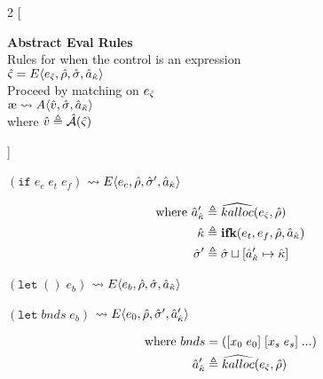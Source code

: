 \documentclass[12pt,draft]{article}
\newcommand\mae{\ensuremath{\text{\ae}}}
\newcommand{\ifsyn}[3]{(\texttt{if}\;#1\;#2\;#3)}
\newcommand{\E}[4]{E\langle #1 , #2 , #3 , #4 \rangle}
\newcommand{\A}[3]{A\langle #1 , #2 , #3 \rangle}
\begin{document}
\newpage
\footnotesize{
\begin{multicols*}{2}
[
\begin{center}
\textbf{Abstract Eval Rules} \\
Rules for when the control is an expression \\
\vspace{2mm}
$\hat{\varsigma} = \E{\ectrl}{\aenv}{\astore}{\akaddr}$ \\
Proceed by matching on $e_{\hat{\varsigma}}$ \\
\vspace{2mm}
$\mae \leadsto \A{\aval}{\astore}{\akaddr}$ \\
where $\hat{v} \triangleq \hat{\mathcal{A}}(\hat{\varsigma})$
\end{center}
]
\begin{center}
  $ \ifsyn{e_c}{e_t}{e_f} $
  $\leadsto \E{e_c}{\aenv}{\astore'}{\akaddr}$
\end{center}
\vspace{-7mm}
\begin{align*}
  \text{where } \hat{a}_{\hat{\kappa}}' &\triangleq \widehat{kalloc}(e_{\hat{\varsigma}} , \hat{\rho}) \\
  \hat{\kappa} &\triangleq \textbf{ifk}(e_t, e_f, \hat{\rho} , \hat{a}_{\hat{\kappa}}) \\
  \hat{\sigma}' &\triangleq \hat{\sigma} \sqcup [\hat{a}_{\hat{\kappa}}' \mapsto \hat{\kappa}]
\end{align*}
\begin{center}
  $(\texttt{let}\;()\;e_b)$
  $\leadsto \E{e_b}{\aenv}{\astore}{\akaddr}$
\end{center}
\begin{center}
  $(\texttt{let}\;bnds\;e_b)$
  $\leadsto \E{e_0}{\aenv}{\astore'}{\akaddr'}$
\end{center}
\vspace{-7mm}
\begin{align*}
  \text{where }
  bnds &= ([x_0\;e_0]\;[x_s\;e_s]\;...) \\
  \akaddr' &\triangleq \akalloc{\ectrl , \aenv} \\

\end{align*}
\end{multicols*}}
\end{document}
